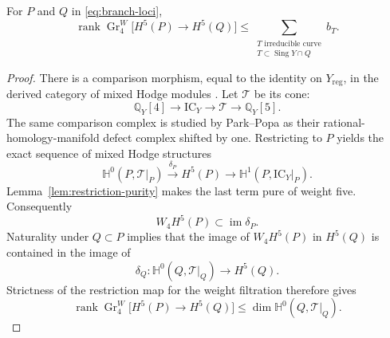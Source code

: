 \begin{lemma}\label{lem:local-system-bound}
For $P$ and $Q$ in \eqref{eq:branch-loci},
\begin{equation}\label{eq:local-system-rank}
 \operatorname{rank}\operatorname{Gr}^{W}_{4}
       \bigl[H^5(P)\longrightarrow H^5(Q)\bigr]
 \leq
 \sum_{\substack{T\text{ irreducible curve}\\
                  T\subset\operatorname{Sing}Y\cap Q}}b_T.
\end{equation}
\end{lemma}

\begin{proof}
There is a comparison morphism, equal to the identity on
$Y_{\mathrm{reg}}$, in the derived category of mixed Hodge modules
\cite[\S1.14]{Saito1989}.  Let $\mathcal T$ be its cone:
\begin{equation}\label{eq:comparison-triangle}
 \mathbb Q_Y[4]\longrightarrow\mathrm{IC}_Y
 \longrightarrow\mathcal T\longrightarrow\mathbb Q_Y[5].
\end{equation}
The same comparison complex is studied by Park--Popa
\cite[Definition~6.1]{ParkPopaHodge} as their rational-homology-manifold
defect complex shifted by one.
Restricting to $P$ yields the exact sequence of mixed Hodge
structures
\begin{equation}\label{eq:comparison-cohomology}
 \mathbb H^0(P,\mathcal T|_P)
 \xrightarrow{\delta_P}H^5(P)
 \longrightarrow\mathbb H^1(P,\mathrm{IC}_Y|_P).
\end{equation}
Lemma~\ref{lem:restriction-purity} makes the last term pure of
weight five.  Consequently
\[
 W_4H^5(P)\subset\operatorname{im}\delta_P.
\]
Naturality under $Q\subset P$ implies that the image of
$W_4H^5(P)$ in $H^5(Q)$ is contained in the image of
\[
 \delta_Q\colon\mathbb H^0(Q,\mathcal T|_Q)\longrightarrow H^5(Q).
\]
Strictness of the restriction map for the weight filtration
therefore gives
\begin{equation}\label{eq:cone-rank}
 \operatorname{rank}\operatorname{Gr}^{W}_{4}
       \bigl[H^5(P)\longrightarrow H^5(Q)\bigr]
 \leq\dim\mathbb H^0(Q,\mathcal T|_Q).
\end{equation}


\end{proof}
